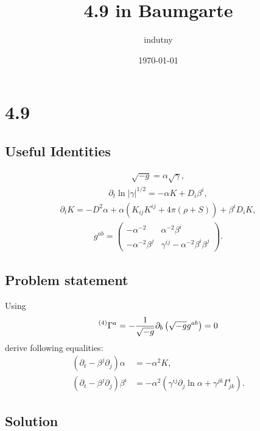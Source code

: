 \documentclass[aps,prd,preprint]{revtex4-1}
\begin{document}
\title{4.9 in Baumgarte}
\author{indutny}
\date{\today}
\noaffiliation

\maketitle

\section{4.9}

\subsection{Useful Identities}

\begin{align}
  \sqrt{-g} = \alpha \sqrt{\gamma},
\end{align}
\begin{align}
  \partial_t \ln |\gamma|^{1 / 2} = -\alpha K + D_i \beta^i,
\end{align}
\begin{align}
  \partial_t K = -D^2 \alpha +
    \alpha \left( K_{ij} K^{ij} + 4 \pi (\rho + S) \right) +
    \beta^i D_i K,
\end{align}
\begin{align}
  g^{ab} = \begin{pmatrix}
    -\alpha^{-2} & \alpha^{-2} \beta^i \\
    -\alpha^{-2} \beta^j & \gamma^{ij} - \alpha^{-2} \beta^i \beta^j
  \end{pmatrix}.
\end{align}

\subsection{Problem statement}

Using
\begin{align}
  \prescript{(4)}{} \Gamma^a = -\frac{1}{\sqrt{-g}} \partial_b \left(
    \sqrt{-g} g^{ab}
  \right) = 0
\end{align}
derive following equalities:
\begin{align}
  (\partial_t - \beta^j \partial_j) \alpha & = -\alpha^2 K, \\
  (\partial_t - \beta^j \partial_j) \beta^i & =
    - \alpha^2 \left( \gamma^{ij} \partial_j \ln \alpha +
    \gamma^{jk} \Gamma^i_{jk} \right).
\end{align}

\subsection{Solution}
\end{document}
